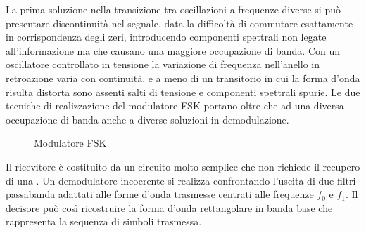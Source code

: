La prima soluzione nella transizione tra oscillazioni a frequenze diverse si può presentare discontinuità nel segnale, data la difficoltà di commutare esattamente in corrispondenza degli zeri, introducendo componenti spettrali non legate all'informazione ma che causano una maggiore occupazione di banda.
Con un oscillatore controllato in tensione la variazione di frequenza nell'anello in retroazione varia con continuità, e  a meno di un transitorio in cui la forma d'onda risulta distorta sono assenti salti di tensione e componenti spettrali spurie.
Le due tecniche di realizzazione del modulatore \ac{FSK} portano oltre che ad una diversa occupazione di banda anche a diverse soluzioni in demodulazione.



\begin{figure}[!ht]
\centering{}\quad{}
\caption{Modulatore \ac{FSK}}
\end{figure}

Il ricevitore è costituito da un circuito  molto semplice che non richiede il recupero di una . Un demodulatore incoerente si realizza confrontando l'uscita di due filtri passabanda adattati alle forme d'onda trasmesse centrati alle frequenze $f_0$ e $f_1$. Il decisore può così ricostruire la forma d'onda rettangolare in banda base che rappresenta la sequenza di simboli trasmessa.

